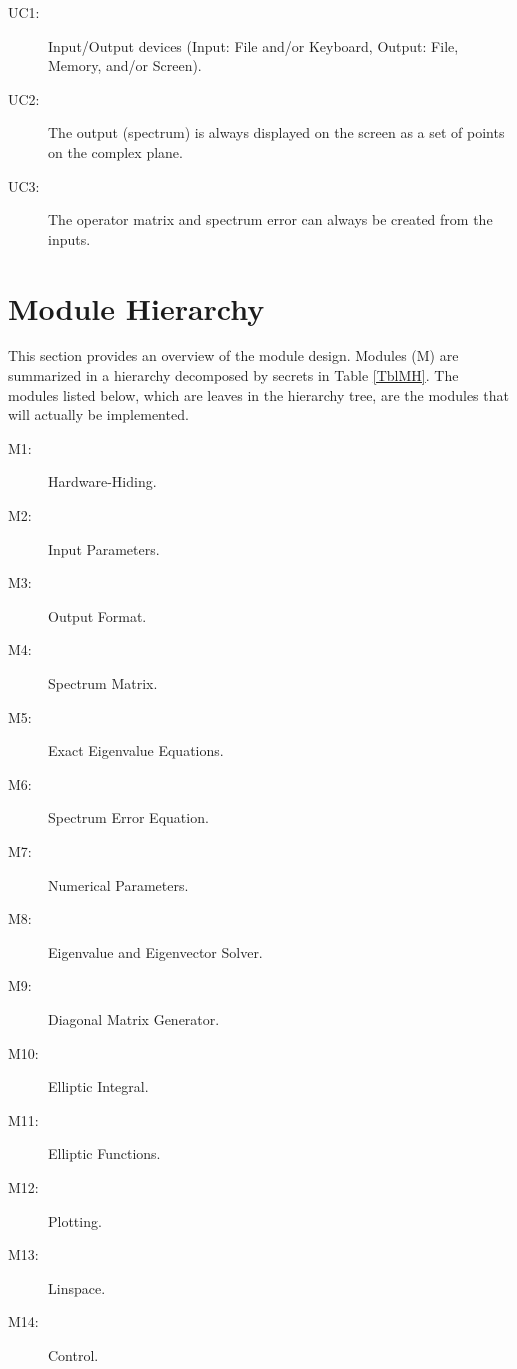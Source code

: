 \documentclass[12pt, titlepage]{article}
\begin{document}
	\begin{description}
		\item[UC1:] Input/Output devices
		(Input: File and/or Keyboard, Output: File, Memory, and/or Screen).
		\item[UC2:] The output (spectrum) is always displayed on the screen as 
		a set of 
		points on the complex plane. 
		\item[UC3:] The operator matrix and spectrum error can always be 
		created from 
		the inputs.
		
	\end{description}
	
	\section{Module Hierarchy} \label{SecMH}
	
	This section provides an overview of the module design. Modules (M) are 
	summarized
	in a hierarchy decomposed by secrets in Table \ref{TblMH}. The modules 
	listed
	below, which are leaves in the hierarchy tree, are the modules that will
	actually be implemented.
	\begin{description}
		\item[M1:] Hardware-Hiding.\\
		\item[M2:] Input Parameters.\\
		\item[M3:] Output Format.\\
		\item[M4:] Spectrum Matrix.\\
		\item[M5:] Exact Eigenvalue Equations.\\ 
		\item[M6:] Spectrum Error Equation.\\
		\item[M7:] Numerical Parameters. \\
		\item[M8:] Eigenvalue and Eigenvector Solver. \\
		\item[M9:] Diagonal Matrix Generator.\\ 
		\item[M10:] Elliptic Integral. \\
		\item[M11:] Elliptic Functions. \\
		\item[M12:] Plotting. \\ 
		\item[M13:] Linspace. \\ 
		\item[M14:] Control. \\
	\end{description}
	
\end{document}
